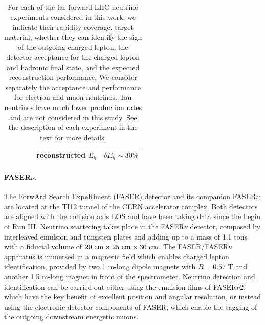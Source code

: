\begin{table}[t]
\begin{tabularx}{\textwidth}{Xccccc}
 &   &     &  & reconstructed $E_h$  &    $\delta E_h \sim 30\% $   \\
  \bottomrule
\end{tabularx}
\vspace{0.2cm}
\caption{\small For each of the far-forward LHC neutrino experiments considered
  in this work, we indicate their rapidity coverage, target material, whether
  they can identify the sign of the outgoing charged lepton,
  the detector acceptance for the charged lepton and hadronic final state,
  and the expected reconstruction performance.
  We consider separately the acceptance and performance for electron and muon
  neutrinos.
  Tau neutrinos have much lower production rates and are not considered in this study.
  See the description of each experiment in the text for more details.
  \label{tab:FPF_experiments}
}
\end{table}

\paragraph{FASER$\nu$.}
%
The ForwArd Search ExpeRiment (FASER) detector and its companion FASER$\nu$
are located at the TI12 tunnel of the CERN accelerator complex.
%
Both detectors are aligned
with the collision axis LOS  and have been taking data since the begin of Run III.
%
Neutrino scattering takes place in the FASER$\nu$
detector, composed by interleaved emulsion and tungsten plates and
adding up to a mass of 1.1 tons with a fiducial volume of $20~\rm{cm} \times 25~\rm{cm} \times 30~{\rm cm}$.
%
The FASER/FASER$\nu$ apparatus is immersed in a magnetic field which enables charged lepton
identification, provided by two 1 m-long dipole magnets with $B=0.57$ T
and another 1.5 m-long magnet in front of the spectrometer. 
%
Neutrino detection and identification can be carried out either using the emulsion
films of FASER$\nu$2, which have the key benefit of excellent position and angular resolution,
or instead using the electronic detector components of FASER, which enable the tagging
of the outgoing downstream energetic muons. 

